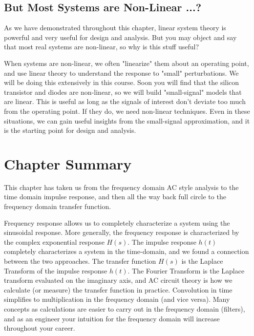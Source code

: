 \subsection{But Most Systems are Non-Linear ...?}
As we have demonstrated throughout this chapter, linear system theory is powerful and very useful for design and analysis.  But you may object and say that most real systems are non-linear, so why is this stuff useful?

When systems are non-linear, we often "linearize" them about an operating point, and use linear theory to understand the response to "small" perturbations.  We will be doing this extensively in this course.  Soon you will find that the silicon transistor and diodes are non-linear, so we will build "small-signal" models that are linear.  This is useful as long as the signals of interest don't deviate too much from the operating point.  If they do, we need non-linear techniques.  Even in these situations,  we can gain useful insights from the small-signal approximation, and it is the starting point for design and analysis.
\newpage
\section{Chapter Summary}
This chapter has taken us from the frequency domain AC style analysis to the time domain impulse response, and then all the way back full circle to the frequency domain transfer function.

Frequency response allows us to completely characterize a system using the sinusoidal response.  More generally, the frequency response is characterized by the complex exponential response $H(s)$.   The impulse response $h(t)$ completely characterizes a system in the time-domain, and we found a connection between the two approaches.   The transfer function $H(s)$ is the Laplace Transform of the impulse response $h(t)$.  The Fourier Transform is the Laplace transform evaluated on the imaginary axis, and AC circuit theory is how we calculate (or measure) the transfer function in practice.   Convolution in time simplifies to multiplication in the frequency domain (and vice versa).  Many concepts as calculations are easier to carry out in the frequency domain (filters), and as an engineer your intuition for the frequency domain will increase throughout your career.
 